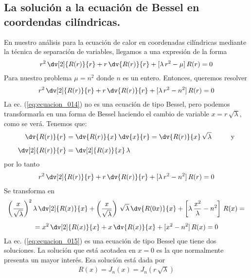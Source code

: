 \subsection{La solución a la ecuación de Bessel en coordendas cilíndricas.}
En nuestro análisis para la ecuación de calor en coordenadas cilíndricas mediante la técnica de separación de variables, llegamos a una expresión de la forma
\begin{align*}
r^{2} \, \dv[2]{R(r)}{r} + r \, \dv{R(r)}{r} + [ \lambda \, r^{2} - \mu ] \, R(r) = 0
\end{align*}
Para nuestro problema $\mu = n^{2}$ donde $n$ es un entero. Entonces, queremos resolver
\begin{align}
r^{2} \, \dv[2]{R(r)}{r} + r \, \dv{R(r)}{r} + [ \lambda \, r^{2} - n^{2} ] \, R(r) = 0
\label{eq:ecuacion_014}
\end{align}
La ec. (\ref{eq:ecuacion_014}) no es una ecuación de tipo Bessel, pero podemos transformarla en una forma de Bessel haciendo el cambio de variable $x = r \, \sqrt{\lambda}$, como se verá. Tenemos que:
\begin{align*}
\dv{R(r)}{r} &= \dv{R(r)}{x} \, \dv{x}{r} = \dv{R(r)}{x} \, \sqrt{\lambda} \hspace{1cm} \mbox{y} \\[0.5em]
\dv[2]{R(r)}{r} &= \dv[2]{R(x)}{x} \, \lambda
\end{align*}
por lo tanto
\begin{align*}
r^{2} \, \dv[2]{R(r)}{r} + r \, \dv{R(r)}{r} + [ \lambda \, r^{2} - n^{2} ] \, R(r) = 0
\end{align*}
Se transforma en
\begin{align}
\begin{aligned}
\left( \dfrac{x}{\sqrt{\lambda}} \right)^{2} \, &\lambda \, \dv[2]{R(x)}{x} + \left( \dfrac{x}{\sqrt{\lambda}} \right) \, \sqrt{\lambda} \, \dv{R(0 x)}{x} + \left[ \lambda \, \dfrac{x^{2}}{\lambda} - n^{2} \right] \, R(x) = \\[0.5em]
&= x^{2} \, \dv[2]{R(x)}{x} + x \, \dv{R(x)}{x} + [x^{2} - n^{2}] \, R(x) = 0
\end{aligned}
\label{eq:ecuacion_015}
\end{align}
La ec. (\ref{eq:ecuacion_015}) es una ecuación de tipo Bessel que tiene dos soluciones. La solución que está acotadea en $x = 0$ es la que normalmente presenta un mayor interés. Esa solución está dada por
\begin{align*}
R(x) = J_{n}(x) = J_{n} (r \, \sqrt{\lambda})
\end{align*}
